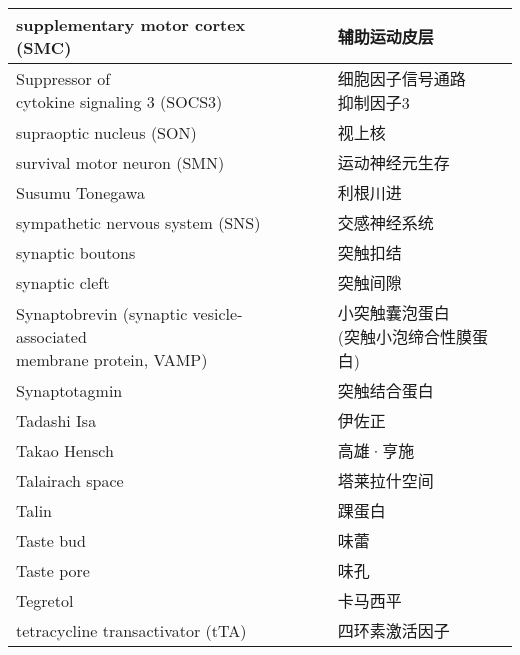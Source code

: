 \begin{longtable}{lll}
	\midrule
	supplementary motor cortex (SMC)   && 辅助运动皮层 \\
	
	\midrule
	\makecell[l]{Suppressor of \\cytokine signaling 3 (SOCS3)}  && \makecell[l]{细胞因子信号通路\\抑制因子3} \\
	
	\midrule
	supraoptic nucleus (SON)  && 视上核 \\
	
	\midrule
	survival motor neuron (SMN) && 运动神经元生存 \\
	
	\midrule
	Susumu Tonegawa && 利根川进 \\
	
	\midrule
	sympathetic nervous system (SNS) && 交感神经系统 \\
	
	\midrule
	synaptic boutons && 突触扣结 \\
	
	\midrule
	synaptic cleft && 突触间隙 \\
	
	\midrule
	\makecell[l]{Synaptobrevin (synaptic vesicle-associated\\ membrane protein, VAMP)}   && \makecell[l]{小突触囊泡蛋白\\ (突触小泡缔合性膜蛋白)} \\
	
	\midrule
	Synaptotagmin   && 突触结合蛋白 \\
	
	\midrule
	Tadashi Isa   && 	伊佐正  \\
	
	\midrule
	Takao Hensch   && 	高雄·亨施  \\
	
	\midrule
	Talairach space   && 	塔莱拉什空间  \\
	
	\midrule
	Talin   && 	踝蛋白  \\
	
	\midrule
	Taste bud   && 	味蕾  \\
	
	\midrule
	Taste pore   && 	味孔  \\
	
	\midrule
	Tegretol   && 	卡马西平  \\
	
	\midrule
	tetracycline transactivator (tTA)   && 四环素激活因子  \\
	

\end{longtable}
